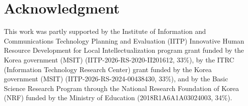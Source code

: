 \documentclass[final,5p,times,twocolumn]{elsarticle}
\begin{document}
\fi
\section {Acknowledgment} 
This work was partly supported by the Institute of Information and
Communications Technology Planning and Evaluation (IITP) Innovative Human
Resource Development for Local Intellectualization program grant funded by
the Korea government (MSIT) (IITP-2026-RS-2020-II201612, 33\%), by the ITRC
(Information Technology Research Center) grant funded by the Korea
government (MSIT) (IITP-2026-RS-2024-00438430, 33\%), and by the Basic
Science Research Program through the National Research Foundation of Korea
(NRF) funded by the Ministry of Education (2018R1A6A1A03024003, 34\%).

 







\end{document}
